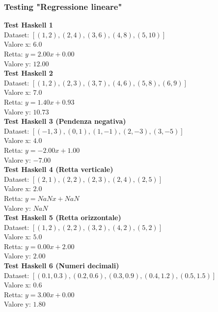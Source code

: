 \documentclass[11pt]{article}
\theoremstyle{definition}
\begin{document}
\subsubsection{Testing "Regressione lineare"}
\noindent
\textbf{Test Haskell 1}\\
Dataset: $[(1, 2), (2, 4), (3, 6), (4, 8), (5, 10)]$\\
Valore x: $6.0$\\
Retta: $y = 2.00x + 0.00$\\
Valore y: $12.00$\\
\newline
\textbf{Test Haskell 2}\\
Dataset: $[(1, 2), (2, 3), (3, 7), (4, 6), (5, 8), (6, 9)]$\\
Valore x: $7.0$\\
Retta: $y = 1.40x + 0.93$\\
Valore y: $10.73$\\
\newline
\textbf{Test Haskell 3 (Pendenza negativa)}\\
Dataset: $[(-1, 3), (0, 1), (1, -1), (2, -3), (3, -5)]$\\
Valore x: $4.0$\\
Retta: $y = -2.00x + 1.00$\\
Valore y: $-7.00$\\
\newline
\textbf{Test Haskell 4 (Retta verticale)}\\
Dataset: $[(2, 1), (2, 2), (2, 3), (2, 4), (2, 5)]$\\
Valore x: $2.0$\\
Retta: $y = NaNx + NaN$\\
Valore y: $NaN$\\
\newline
\textbf{Test Haskell 5 (Retta orizzontale)}\\
Dataset: $[(1, 2), (2, 2), (3, 2), (4, 2), (5, 2)]$\\
Valore x: $5.0$\\
Retta: $y = 0.00x + 2.00$\\
Valore y: $2.00$\\
\newline
\textbf{Test Haskell 6 (Numeri decimali)}\\
Dataset: $[(0.1, 0.3), (0.2, 0.6), (0.3, 0.9), (0.4, 1.2), (0.5, 1.5)]$\\
Valore x: $0.6$\\
Retta: $y = 3.00x + 0.00$\\
Valore y: $1.80$
\end{document}
